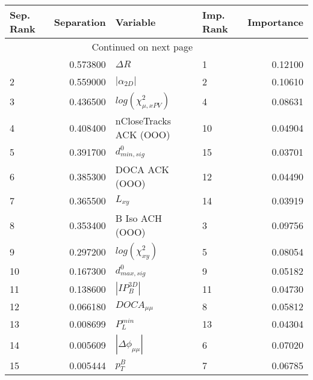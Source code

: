 \usepackage{lscape}

\begin{landscape}
\begin{longtable}{lrllr}
\toprule
Sep. Rank &  Separation &                   Variable & Imp. Rank &  Importance \\
\midrule
\endhead
\midrule
\multicolumn{3}{r}{{Continued on next page}} \\
\midrule
\endfoot

\bottomrule
\endlastfoot
        1 &    0.573800 &                 $\Delta R$ &         1 &     0.12100 \\
        2 &    0.559000 &            $|\alpha_{2D}|$ &         2 &     0.10610 \\
        3 &    0.436500 &  $log(\chi^{2}_{\mu,xPV})$ &         4 &     0.08631 \\
        4 &    0.408400 &     nCloseTracks ACK (OOO) &        10 &     0.04904 \\
        5 &    0.391700 &           $d^0_{min, sig}$ &        15 &     0.03701 \\
        6 &    0.385300 &             DOCA ACK (OOO) &        12 &     0.04490 \\
        7 &    0.365500 &                   $L_{xy}$ &        14 &     0.03919 \\
        8 &    0.353400 &            B Iso ACH (OOO) &         3 &     0.09756 \\
        9 &    0.297200 &       $log(\chi^{2}_{xy})$ &         5 &     0.08054 \\
       10 &    0.167300 &           $d^0_{max, sig}$ &         9 &     0.05182 \\
       11 &    0.138600 &            $|IP_{B}^{3D}|$ &        11 &     0.04730 \\
       12 &    0.066180 &            $DOCA_{\mu\mu}$ &         8 &     0.05812 \\
       13 &    0.008699 &              $P^{min}_{L}$ &        13 &     0.04304 \\
       14 &    0.005609 &   $|\Delta \phi_{\mu\mu}|$ &         6 &     0.07020 \\
       15 &    0.005444 &                  $p^B_{T}$ &         7 &     0.06785 \\
\end{longtable}

\end{landscape}
